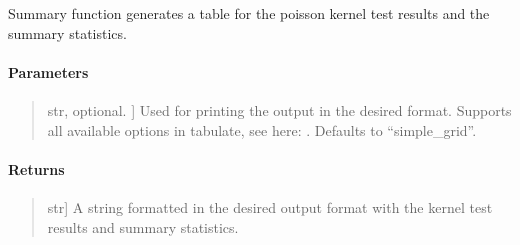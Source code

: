 \documentclass[letterpaper,10pt,english,openany,oneside]{sphinxmanual}
\begin{document}
\begin{fulllineitems}
\label{\detokenize{api_reference/generated/QuadratiK.poisson_kernel_test.PoissonKernelTest:QuadratiK.poisson_kernel_test.PoissonKernelTest.summary}}
\pysigstartsignatures
{}
\pysigstopsignatures
\sphinxAtStartPar
Summary function generates a table for 
the poisson kernel test results and the summary statistics.


\paragraph{Parameters}
\label{\detokenize{api_reference/generated/QuadratiK.poisson_kernel_test.PoissonKernelTest:id1}}\begin{quote}
\begin{description}
\sphinxlineitem{print\_fmt}{[}str, optional. {]}
\sphinxAtStartPar
Used for printing the output in the desired format. 
Supports all available options in tabulate, 
see here: . 
Defaults to “simple\_grid”.

\end{description}
\end{quote}


\paragraph{Returns}
\label{\detokenize{api_reference/generated/QuadratiK.poisson_kernel_test.PoissonKernelTest:id2}}\begin{quote}
\begin{description}
\sphinxlineitem{summary}{[}str{]}
\sphinxAtStartPar
A string formatted in the desired output 
format with the kernel test results and summary statistics.

\end{description}
\end{quote}

\end{fulllineitems}

\end{document}
